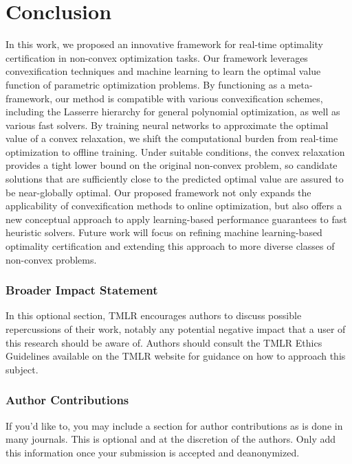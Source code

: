 \documentclass[10pt]{article} %
\theoremstyle{plain}
\theoremstyle{definition}
\theoremstyle{remark}
\begin{document}
\section{Conclusion} \label{sec:conclusion}
In this work, we proposed an innovative framework for real-time optimality certification in non-convex optimization tasks.
Our framework leverages convexification techniques and machine learning to learn the optimal value function of parametric optimization problems.
{By functioning as a meta-framework, our method is compatible with various convexification schemes, including the Lasserre hierarchy for general polynomial optimization, as well as various fast solvers.} By training neural networks to approximate the optimal value of a convex relaxation, we shift the computational burden from real-time optimization to offline training. Under suitable conditions, the convex relaxation provides a tight lower bound on the original non-convex problem, so candidate solutions that are sufficiently close to the predicted optimal value are assured to be near-globally optimal.
Our proposed framework not only expands the applicability of convexification methods to online optimization, but also offers a new conceptual approach to apply learning-based performance guarantees to fast heuristic solvers.
Future work will focus on refining machine learning-based optimality certification and extending this approach to more diverse classes of non-convex problems.


\subsubsection*{Broader Impact Statement}
In this optional section, TMLR encourages authors to discuss possible repercussions of their work,
notably any potential negative impact that a user of this research should be aware of. 
Authors should consult the TMLR Ethics Guidelines available on the TMLR website
for guidance on how to approach this subject.

\subsubsection*{Author Contributions}
If you'd like to, you may include a section for author contributions as is done
in many journals. This is optional and at the discretion of the authors. Only add
this information once your submission is accepted and deanonymized. 
\end{document}
